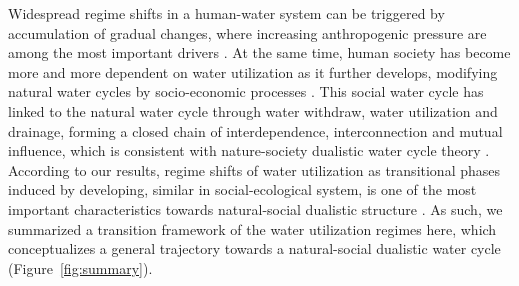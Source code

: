 \documentclass[9pt, twocolumn, twoside, lineno]{pnas-new}
\begin{document}
Widespread regime shifts in a human-water system can be triggered by accumulation of gradual changes, where increasing anthropogenic pressure are among the most important drivers \cite{rochaCascadingRegimeShifts2018a,falkenmarkUnderstandingWaterResilience2019}. 
At the same time, human society has become more and more dependent on water utilization as it further develops, modifying natural water cycles by socio-economic processes \cite{gleesonIlluminatingWaterCycle2020,dibaldassarreSociohydrologyScientificChallenges2019}.
This social water cycle has linked to the natural water cycle through water withdraw, water utilization and drainage, forming a closed chain of interdependence, interconnection and mutual influence, which is consistent with nature-society dualistic water cycle theory 
\cite{qinTheoreticalFrameworkDualistic2014,liuDualisticWaterCycle2010}.
According to our results, regime shifts of water utilization as transitional phases induced by developing, similar in social-ecological system, is one of the most important characteristics towards natural-social dualistic structure 
\cite{cummingImplicationsAgriculturalTransitions2014,cummingLinkingEconomicGrowth2018}.
As such, we summarized a transition framework of the water utilization regimes here, which conceptualizes a general trajectory towards a natural-social dualistic water cycle (Figure~\ref{fig:summary}).
\end{document}
